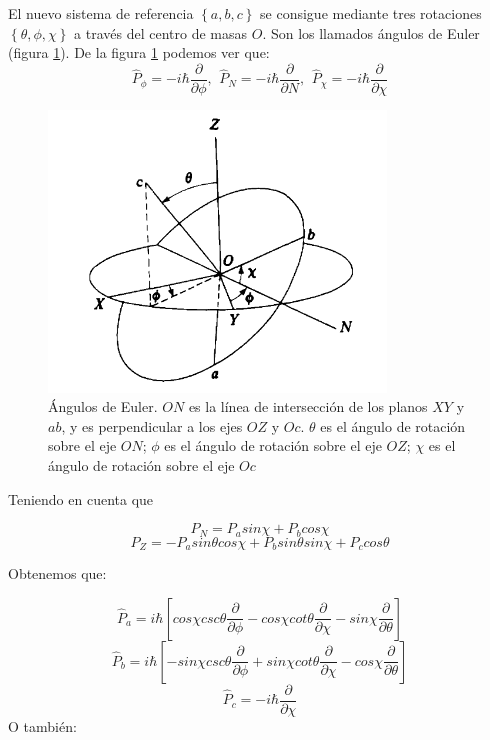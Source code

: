 \documentclass[a4paper]{article}
\begin{document}
El nuevo sistema de referencia $\left\lbrace a,b,c \right\rbrace$ se consigue mediante tres rotaciones  $\left\lbrace \theta,\phi,\chi \right\rbrace$ a través del centro de masas $O$. Son los llamados ángulos de Euler (figura \ref{euler}).
De la figura \ref{euler} podemos ver que:
\begin{equation}
\hat P_{\phi}=-i\hbar\frac{\partial}{\partial \phi},\,\ \hat P_{N}=-i\hbar\frac{\partial}{\partial N},\,\ \hat P_{\chi}=-i\hbar\frac{\partial}{\partial \chi}
\end{equation}

\begin{figure}
\includegraphics[width=0.8\textwidth]{Angulos_Euler.png}
\caption{Ángulos de Euler. $ON$ es la línea de intersección de los planos $XY$ y $ab$, y es perpendicular a los ejes $OZ$ y $Oc$. $\theta$ es el ángulo de rotación sobre el eje $ON$; $\phi$ es el ángulo de rotación sobre el eje $OZ$; $\chi$ es el ángulo de rotación sobre el eje $Oc$ }
\label{euler}
\end{figure}

Teniendo en cuenta que 

$$ P_N=  P_a sin\chi + P_b cos\chi$$  
$$ P_Z= -P_a sin\theta cos\chi + P_b sin\theta sin\chi + P_c cos\theta $$

Obtenemos que:

\begin{equation}
\hat P_a = i\hbar \left[cos\chi csc\theta \frac{\partial}{\partial \phi} - cos\chi cot\theta \frac{\partial}{\partial \chi} - sin\chi \frac{\partial}{\partial \theta} \right]
\end{equation}
\begin{equation}
\hat P_b = i\hbar \left[-sin\chi csc\theta \frac{\partial}{\partial \phi} + sin\chi cot\theta \frac{\partial}{\partial \chi} - cos\chi \frac{\partial}{\partial \theta} \right]
\end{equation}
\begin{equation}
\hat P_c = -i\hbar \frac{\partial}{\partial\chi}
\end{equation}
O también:
\end{document}

